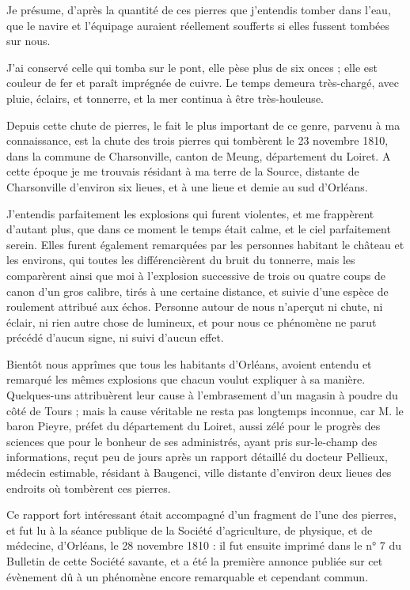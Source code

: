 \documentclass[a4paper, 12pt, oneside, french]{article}
\begin{document}
\og Je présume, d'après la quantité de ces pierres que j'entendis tomber dans l'eau, que le navire et l'équipage auraient réellement soufferts si elles fussent tombées sur nous. \fg

\og J'ai conservé celle qui tomba sur le pont, elle pèse plus de six onces ; elle est couleur de fer et paraît imprégnée de cuivre. Le temps demeura très-chargé, avec pluie, éclairs, et tonnerre, et la mer continua à être très-houleuse. \fg

Depuis cette chute de pierres, le fait le plus important de ce genre, parvenu à ma connaissance, est la chute des trois pierres qui tombèrent le 23 novembre 1810, dans la commune de Charsonville, canton de Meung, département du Loiret. A cette époque je me trouvais résidant à ma terre de la Source, distante de Charsonville d'environ six lieues, et à une lieue et demie au sud d'Orléans.

J'entendis parfaitement les explosions qui furent violentes, et me frappèrent d'autant plus, que dans ce moment le temps était calme, et le ciel parfaitement serein. Elles furent également remarquées par les personnes habitant le château et les environs, qui toutes les différencièrent du bruit du tonnerre, mais les comparèrent ainsi que moi à l'explosion successive de trois ou quatre coups de canon d'un gros calibre, tirés à une certaine distance, et suivie d'une espèce de roulement attribué aux échos. Personne autour de nous n'aperçut ni chute, ni éclair, ni rien autre chose de lumineux, et pour nous ce phénomène ne parut précédé d'aucun signe, ni suivi d'aucun effet.

Bientôt nous apprîmes que tous les habitants d'Orléans, avoient entendu et remarqué les mêmes explosions que chacun voulut expliquer à sa manière. Quelques-uns attribuèrent leur cause à l'embrasement d'un magasin à poudre du côté de Tours ; mais la cause véritable ne resta pas longtemps inconnue, car M. le baron Pieyre, préfet du département du Loiret, aussi zélé pour le progrès des sciences que pour le bonheur de ses administrés, ayant pris sur-le-champ des informations, reçut peu de jours après un rapport détaillé du docteur Pellieux, médecin estimable, résidant à Baugenci, ville distante d'environ deux lieues des endroits où tombèrent ces pierres.

Ce rapport fort intéressant était accompagné d'un fragment de l'une des pierres, et fut lu à la séance publique de la Société d'agriculture, de physique, et de médecine, d'Orléans, le 28 novembre 1810 : il fut ensuite imprimé dans le n° 7 du Bulletin de cette Société savante, et a été la première annonce publiée sur cet évènement dû à un phénomène encore remarquable et cependant commun.
\end{document}
